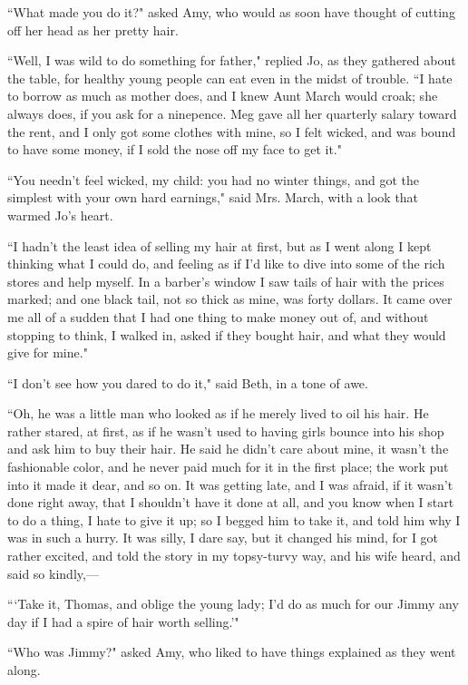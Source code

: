 ``What made you do it?" asked Amy, who would as soon have thought of
cutting off her head as her pretty hair.

``Well, I was wild to do something for father," replied Jo, as they
gathered about the table, for healthy young people can eat even in the
midst of trouble. ``I hate to borrow as much as mother does, and I knew
Aunt March would croak; she always does, if you ask for a ninepence. Meg
gave all her quarterly salary toward the rent, and I only got some
clothes with mine, so I felt wicked, and was bound to have some money,
if I sold the nose off my face to get it."

``You needn't feel wicked, my child: you had no winter
things, and got the simplest with your own hard earnings," said Mrs.
March, with a look that warmed Jo's heart.

``I hadn't the least idea of selling my hair at first,
but as I went along I kept thinking what I could do, and feeling as if
I'd like to dive into some of the rich stores and help
myself. In a barber's window I saw tails of hair with
the prices marked; and one black tail, not so thick as mine, was forty
dollars. It came over me all of a sudden that I had one thing to make
money out of, and without stopping to think, I walked in, asked if they
bought hair, and what they would give for mine."

``I don't see how you dared to do it," said Beth, in a
tone of awe.

``Oh, he was a little man who looked as if he merely lived to oil his
hair. He rather stared, at first, as if he wasn't used
to having girls bounce into his shop and ask him to buy their hair. He
said he didn't care about mine, it
wasn't the fashionable color, and he never paid much for
it in the first place; the work put into it made it dear, and so on. It
was getting late, and I was afraid, if it wasn't done
right away, that I shouldn't have it done at all, and
you know when I start to do a thing, I hate to give it up; so I begged
him to take it, and told him why I was in such a hurry. It was silly, I
dare say, but it changed his mind, for I got rather excited, and told
the story in my topsy-turvy way, and his wife heard, and said so
kindly,---

```Take it, Thomas, and oblige the young lady;
I'd do as much for our Jimmy any day if I had a spire of
hair worth selling.'"

``Who was Jimmy?" asked Amy, who liked to have things explained as they
went along.

